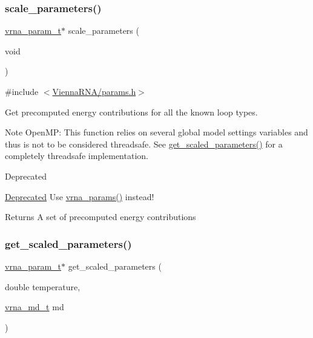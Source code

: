\subsubsection{\texorpdfstring{scale\+\_\+parameters()}{scale\_parameters()}}
{\footnotesize\ttfamily \hyperlink{group__energy__parameters_ga8a69ca7d787e4fd6079914f5343a1f35}{vrna\+\_\+param\+\_\+t}$\ast$ scale\+\_\+parameters (\begin{DoxyParamCaption}\item[{void}]{ }\end{DoxyParamCaption})}



{\ttfamily \#include $<$\hyperlink{params_8h}{Vienna\+R\+N\+A/params.\+h}$>$}



Get precomputed energy contributions for all the known loop types. 

\begin{DoxyNote}{Note}
Open\+MP\+: This function relies on several global model settings variables and thus is not to be considered threadsafe. See \hyperlink{group__energy__parameters_ga7fa6a000d7c16feab939f2c4ee626197}{get\+\_\+scaled\+\_\+parameters()} for a completely threadsafe implementation.
\end{DoxyNote}
\begin{DoxyRefDesc}{Deprecated}
\item[\hyperlink{deprecated__deprecated000097}{Deprecated}]Use \hyperlink{group__energy__parameters_gad0e3e7e74bdc50d1709d40c92993185e}{vrna\+\_\+params()} instead!\end{DoxyRefDesc}


\begin{DoxyReturn}{Returns}
A set of precomputed energy contributions 
\end{DoxyReturn}
\mbox{\label{group__energy__parameters_ga7fa6a000d7c16feab939f2c4ee626197}} 
\subsubsection{\texorpdfstring{get\+\_\+scaled\+\_\+parameters()}{get\_scaled\_parameters()}}
{\footnotesize\ttfamily \hyperlink{group__energy__parameters_ga8a69ca7d787e4fd6079914f5343a1f35}{vrna\+\_\+param\+\_\+t}$\ast$ get\+\_\+scaled\+\_\+parameters (\begin{DoxyParamCaption}\item[{double}]{temperature,  }\item[{\hyperlink{group__model__details_ga1f8a10e12a0a1915f2a4eff0b28ea17c}{vrna\+\_\+md\+\_\+t}}]{md }\end{DoxyParamCaption})}



